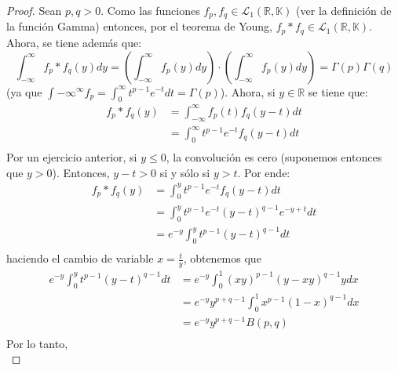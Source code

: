 \documentclass[12pt]{report}
\newcounter{it}
\theoremstyle{largebreak}
\begin{document}
    \begin{proof}
        Sean $p,q>0$. Como las funciones $f_p,f_q\in\mathcal{L}_1(\mathbb{R},\mathbb{K})$ (ver la definición de la función Gamma) entonces, por el teorema de Young, $f_p*f_q\in\mathcal{L}_1(\mathbb{R},\mathbb{K})$. Ahora, se tiene además que:
        \begin{equation*}
            \int_{-\infty}^\infty f_p*f_q(y)dy=\left(\int_{-\infty}^\infty f_p(y)dy \right)\cdot\left(\int_{-\infty}^\infty f_p(y)dy \right)=\Gamma(p)\Gamma(q)
        \end{equation*}
        (ya que $\int{-\infty}^\infty f_p=\int_0^\infty t^{ p-1}e^{-t}dt=\Gamma(p)$). Ahora, si $y\in\mathbb{R}$ se tiene que:
        \begin{equation*}
            \begin{split}
                f_p*f_q(y)&=\int_{-\infty}^\infty f_p(t)f_q(y-t)dt\\
                &=\int_{0}^\infty t^{p-1}e^{-t}f_q(y-t)dt\\
            \end{split}
        \end{equation*}
        Por un ejercicio anterior, si $y\leq 0$, la convolución es cero (suponemos entonces que $y>0$). Entonces, $y-t>0$ si y sólo si $y>t$. Por ende:
        \begin{equation*}
            \begin{split}
                f_p*f_q(y)&=\int_{0}^y t^{p-1}e^{-t}f_q(y-t)dt\\
                &=\int_{0}^y t^{p-1}e^{-t}(y-t)^{q-1}e^{-y+t}dt\\
                &=e^{-y}\int_{0}^y t^{p-1}(y-t)^{q-1}dt\\
            \end{split}
        \end{equation*}
        haciendo el cambio de variable $x=\frac{t}{y}$, obtenemos que
        \begin{equation*}
            \begin{split}
                e^{-y}\int_{0}^y t^{p-1}(y-t)^{q-1}dt&=e^{-y}\int_{0}^1 (xy)^{p-1}(y-xy)^{q-1}ydx\\
                &=e^{-y}y^{ p+q-1}\int_{0}^1 x^{p-1}(1-x)^{q-1}dx\\
                &=e^{-y}y^{ p+q-1}B(p,q)\\
            \end{split}
        \end{equation*}
        Por lo tanto,
        \begin{equation*}

\end{equation*}
\end{proof}
\end{document}
